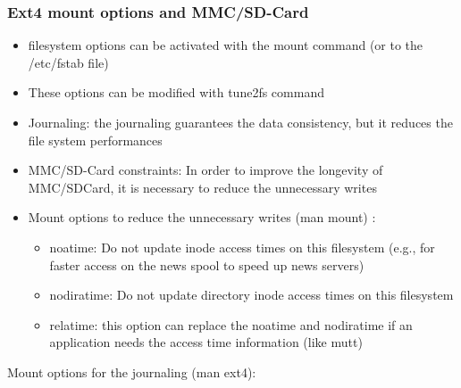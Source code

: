 \documentclass[resume]{subfiles}
\begin{document}
\subsubsection{Ext4 mount options and MMC/SD-Card}
\begin{itemize}
    \item filesystem options can be activated with the mount command (or to the /etc/fstab file)
    \item These options can be modified with tune2fs command
    \item Journaling: the journaling guarantees the data consistency, but it reduces the file system performances
    \item MMC/SD-Card constraints: In order to improve the longevity of MMC/SDCard, it is necessary to reduce the unnecessary writes
    \item Mount options to reduce the unnecessary writes (man mount) :
    \begin{itemize}
        \item noatime: Do not update inode access times on this filesystem (e.g., for faster access on the news spool to speed up news servers)
        \item nodiratime: Do not update directory inode access times on this filesystem
        \item relatime: this option can replace the noatime and nodiratime if an application needs the access time information (like mutt)
    \end{itemize}
\end{itemize}
Mount options for the journaling (man ext4):
\end{document}
